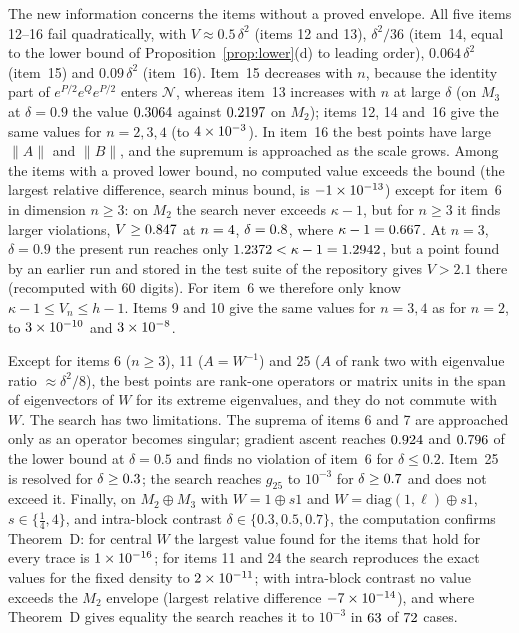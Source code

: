 \documentclass[11pt]{article}
\newcommand{\cN}{\mathcal{N}}
\theoremstyle{plain}
\theoremstyle{definition}
\theoremstyle{remark}
\begin{document}
The new information concerns the items without a proved envelope. All five items 12--16 fail quadratically, with
$V\approx0.5\,\delta^2$ (items 12 and 13), $\delta^2/36$ (item~14, equal to the lower bound of
Proposition~\ref{prop:lower}(d) to leading order), $0.064\,\delta^2$ (item~15) and $0.09\,\delta^2$ (item~16). Item~15
decreases with $n$, because the identity part of $e^{P/2}e^Qe^{P/2}$ enters $\cN$, whereas item~13 increases with $n$ at
large $\delta$ (on $M_3$ at $\delta=0.9$ the value $0.3064$ against $0.2197$ on $M_2$); items 12,
14 and~16 give the same values for $n=2,3,4$ (to $4\times10^{-3}$). In item~16 the best points have large $\|A\|$ and $\|B\|$, and the supremum is approached as the
scale grows. Among the items with a proved lower bound, no computed value exceeds the bound (the largest relative
difference, search minus bound, is $-1\times10^{-13}$) except for item~6 in dimension $n\ge3$: on $M_2$ the search never
exceeds $\kappa-1$, but for $n\ge3$ it finds larger violations, $V\ge0.847$ at $n=4$,
$\delta=0.8$, where $\kappa-1=0.667$. At $n=3$, $\delta=0.9$ the present run reaches only
$1.2372<\kappa-1=1.2942$, but a point found by an earlier run and stored in the test suite of the
repository gives $V>2.1$ there (recomputed with 60 digits). For item~6 we therefore only know $\kappa-1\le V_n\le h-1$. Items 9
and 10 give the same values for $n=3,4$ as for $n=2$, to $3\times10^{-10}$ and $3\times10^{-8}$.

Except for items 6 ($n\ge3$), 11 ($A=W^{-1}$) and 25 ($A$ of rank two with eigenvalue ratio $\approx\delta^2/8$), the best
points are rank-one operators or matrix units in the span of eigenvectors of $W$ for its extreme eigenvalues, and they do
not commute with $W$. The search has two limitations. The suprema of items 6 and 7 are approached only as an operator
becomes singular; gradient ascent reaches $0.924$ and $0.796$ of the lower bound at $\delta=0.5$ and
finds no violation of item~6 for $\delta\le0.2$. Item~25 is resolved for $\delta\ge0.3$; the search reaches
$g_{25}$ to $10^{-3}$ for $\delta\ge0.7$ and does not exceed it. Finally, on $M_2\oplus M_3$ with
$W=1\oplus s1$ and $W=\mathrm{diag}(1,\ell)\oplus s1$, $s\in\{\frac14,4\}$, and intra-block contrast
$\delta\in\{0.3,0.5,0.7\}$, the computation confirms Theorem~D: for central $W$ the largest value found for the items that
hold for every trace is $1\times10^{-16}$; for items 11 and 24 the search reproduces the exact values for the fixed
density to $2\times10^{-11}$; with intra-block contrast no value exceeds the $M_2$ envelope (largest relative difference
$-7\times10^{-14}$), and where Theorem~D gives equality the search reaches it to $10^{-3}$ in $63$ of
$72$ cases.
\end{document}
